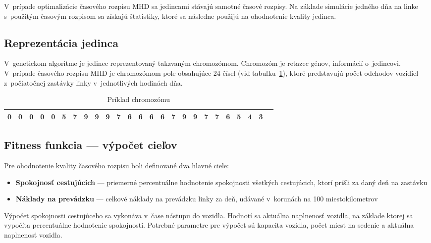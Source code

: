V~prípade optimalizácie časového rozpisu MHD sa jedincami stávajú samotné časové rozpisy.
Na základe simulácie jedného dňa na linke s~použitým časovým rozpisom sa získajú štatistiky, ktoré sa následne použijú na ohodnotenie kvality jedinca.

\subsection*{Reprezentácia jedinca}
V~genetickom algoritme je jedinec reprezentovaný takzvaným chromozómom.
Chromozóm je reťazec génov, informácií o~jedincovi.
V~prípade časového rozpisu MHD je chromozómom pole obsahujúce 24 čísel (viď tabuľku~\ref{tab:chromosome}), ktoré predstavujú počet odchodov vozidiel z~počiatočnej zastávky linky v~jednotlivých hodinách dňa.

\begin{table}[h]\label{tab:chromosome}
  \centering
  \begin{tabularx}{\textwidth}{|l|X|X|X|X|X|X|X|X|X|X|X|X|X|X|X|X|X|X|X|X|X|X|X|X|}
    \hline
    0 & 0 & 0 & 0 & 0 & 5 & 7 & 9 & 9 & 9 & 7 & 6 & 6 & 6 & 6 & 7 & 9 & 9 & 7 & 7 & 6 & 5 & 4 & 3 \\ \hline
  \end{tabularx}
  \caption{Príklad chromozómu}
\end{table}

\subsection*{Fitness funkcia --- výpočet cieľov}\label{fitness}
Pre ohodnotenie kvality časového rozpisu boli definované dva hlavné ciele:
\begin{itemize}
  \item \textbf{Spokojnosť cestujúcich} --- priemerné percentuálne hodnotenie spokojnosti všetkých cestujúcich, ktorí prišli za daný deň na zastávku
  \item \textbf{Náklady na prevádzku} --- celkové náklady na prevádzku linky za deň, udávané v~korunách na 100 miestokilometrov
\end{itemize}

Výpočet spokojnosti cestujúceho sa vykonáva v~čase nástupu do vozidla. Hodnotí sa aktuálna naplnenosť vozidla, na základe ktorej sa vypočíta percentuálne hodnotenie spokojnosti.
Potrebné parametre pre výpočet sú kapacita vozidla, počet miest na sedenie a aktuálna naplnenosť vozidla.

